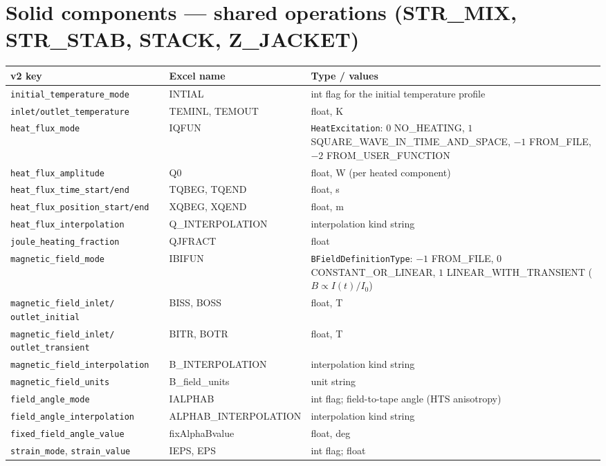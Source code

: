 \documentclass[10pt,a4paper]{article}
\newcommand{\code}[1]{\texttt{#1}}
\begin{document}
\section*{Solid components --- shared operations (STR\_MIX, STR\_STAB, STACK, Z\_JACKET)}

\begin{longtable}{p{5.6cm}p{3.4cm}p{6.2cm}}
\toprule
\textbf{v2 key} & \textbf{Excel name} & \textbf{Type / values} \\
\midrule
\endhead
\code{initial\_temperature\_mode} & INTIAL & int flag for the initial temperature profile \\
\code{inlet/outlet\_temperature} & TEMINL, TEMOUT & float, K \\
\code{heat\_flux\_mode} & IQFUN & \code{HeatExcitation}: $0$ NO\_HEATING, $1$ SQUARE\_WAVE\_IN\_TIME\_AND\_SPACE, $-1$ FROM\_FILE, $-2$ FROM\_USER\_FUNCTION \\
\code{heat\_flux\_amplitude} & Q0 & float, W (per heated component) \\
\code{heat\_flux\_time\_start/end} & TQBEG, TQEND & float, s \\
\code{heat\_flux\_position\_start/end} & XQBEG, XQEND & float, m \\
\code{heat\_flux\_interpolation} & Q\_INTERPOLATION & interpolation kind string \\
\code{joule\_heating\_fraction} & QJFRACT & float \\
\code{magnetic\_field\_mode} & IBIFUN & \code{BFieldDefinitionType}: $-1$ FROM\_FILE, $0$ CONSTANT\_OR\_LINEAR, $1$ LINEAR\_WITH\_TRANSIENT ($B \propto I(t)/I_0$) \\
\code{magnetic\_field\_inlet/} \code{outlet\_initial} & BISS, BOSS & float, T \\
\code{magnetic\_field\_inlet/} \code{outlet\_transient} & BITR, BOTR & float, T \\
\code{magnetic\_field\_interpolation} & B\_INTERPOLATION & interpolation kind string \\
\code{magnetic\_field\_units} & B\_field\_units & unit string \\
\code{field\_angle\_mode} & IALPHAB & int flag; field-to-tape angle (HTS anisotropy) \\
\code{field\_angle\_interpolation} & ALPHAB\_INTERPOLATION & interpolation kind string \\
\code{fixed\_field\_angle\_value} & fixAlphaBvalue & float, deg \\
\code{strain\_mode}, \code{strain\_value} & IEPS, EPS & int flag; float \\

\end{longtable}
\end{document}
